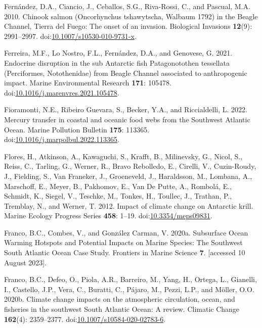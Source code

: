\documentclass[
]{article}
\newlength{\cslhangindent}
\newenvironment{CSLReferences}[2] %
 {\begin{list}{}{%
  \setlength{\itemindent}{0pt}
  \setlength{\leftmargin}{0pt}
  \setlength{\parsep}{0pt}
  \ifodd #1
   \setlength{\leftmargin}{\cslhangindent}
   \setlength{\itemindent}{-1\cslhangindent}
  \fi
  \setlength{\itemsep}{#2\baselineskip}}}
 {\end{list}}
\begin{document}
\begin{CSLReferences}{1}{0}
Fernández, D.A., Ciancio, J., Ceballos, S.G., Riva-Rossi, C., and
Pascual, M.A. 2010. Chinook salmon ({Oncorhynchus} tshawytscha,
{Walbaum} 1792) in the {Beagle Channel}, {Tierra} del {Fuego}: The onset
of an invasion. Biological Invasions \textbf{12}(9): 2991--2997.
doi:\href{https://doi.org/10.1007/s10530-010-9731-x}{10.1007/s10530-010-9731-x}.

Ferreira, M.F., Lo Nostro, F.L., Fernández, D.A., and Genovese, G. 2021.
Endocrine disruption in the sub {Antarctic} fish {Patagonotothen}
tessellata ({Perciformes}, {Notothenidae}) from {Beagle Channel}
associated to anthropogenic impact. Marine Environmental Research
\textbf{171}: 105478.
doi:\href{https://doi.org/10.1016/j.marenvres.2021.105478}{10.1016/j.marenvres.2021.105478}.

Fioramonti, N.E., Ribeiro Guevara, S., Becker, Y.A., and Riccialdelli,
L. 2022. Mercury transfer in coastal and oceanic food webs from the
{Southwest Atlantic Ocean}. Marine Pollution Bulletin \textbf{175}:
113365.
doi:\href{https://doi.org/10.1016/j.marpolbul.2022.113365}{10.1016/j.marpolbul.2022.113365}.

Flores, H., Atkinson, A., Kawaguchi, S., Krafft, B., Milinevsky, G.,
Nicol, S., Reiss, C., Tarling, G., Werner, R., Bravo Rebolledo, E.,
Cirelli, V., Cuzin-Roudy, J., Fielding, S., Van Franeker, J.,
Groeneveld, J., Haraldsson, M., Lombana, A., Marschoff, E., Meyer, B.,
Pakhomov, E., Van De Putte, A., Rombolá, E., Schmidt, K., Siegel, V.,
Teschke, M., Tonkes, H., Toullec, J., Trathan, P., Tremblay, N., and
Werner, T. 2012. Impact of climate change on {Antarctic} krill. Marine
Ecology Progress Series \textbf{458}: 1--19.
doi:\href{https://doi.org/10.3354/meps09831}{10.3354/meps09831}.

Franco, B.C., Combes, V., and González Carman, V. 2020a. Subsurface
{Ocean Warming Hotspots} and {Potential Impacts} on {Marine Species}:
{The Southwest South Atlantic Ocean Case Study}. Frontiers in Marine
Science \textbf{7}. {[}accessed 10 August 2023{]}.

Franco, B.C., Defeo, O., Piola, A.R., Barreiro, M., Yang, H., Ortega,
L., Gianelli, I., Castello, J.P., Vera, C., Buratti, C., Pájaro, M.,
Pezzi, L.P., and Möller, O.O. 2020b. Climate change impacts on the
atmospheric circulation, ocean, and fisheries in the southwest {South
Atlantic Ocean}: A review. Climatic Change \textbf{162}(4): 2359--2377.
doi:\href{https://doi.org/10.1007/s10584-020-02783-6}{10.1007/s10584-020-02783-6}.


\end{CSLReferences}
\end{document}
